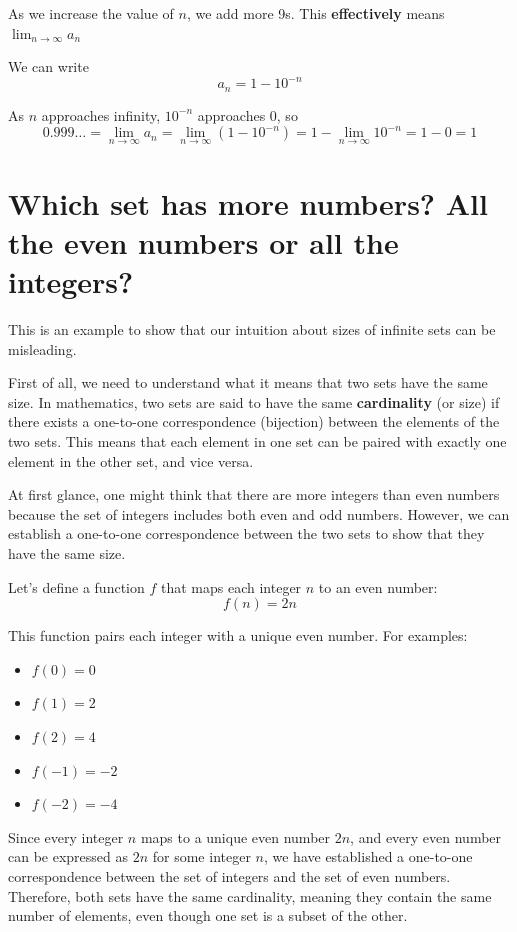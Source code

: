 \documentclass[12pt, letterpaper, oneside]{article}
\begin{document}
As we increase the value of \(n\), we add more 9s. This \textbf{effectively} means \(\lim_{n \to \infty} a_n\)

We can write
\[a_n = 1 - 10^{-n}\]

As \(n\) approaches infinity, \(10^{-n}\) approaches 0, so
\[0.999\ldots = \lim_{n \to \infty} a_n = \lim_{n \to \infty} (1 - 10^{-n}) = 1 - \lim_{n \to \infty} 10^{-n} = 1 - 0 = 1\]

\section{Which set has more numbers? All the even numbers or all the integers?}

This is an example to show that our intuition about sizes of infinite sets can be misleading.

First of all, we need to understand what it means that two sets have the same size. In mathematics, two sets are said to
have the same \textbf{cardinality} (or size) if there exists a one-to-one correspondence (bijection) between the elements
of the two sets. This means that each element in one set can be paired with exactly one element in the other set, and
vice versa.

At first glance, one might think that there are more integers than even numbers because the set of integers includes
both even and odd numbers. However, we can establish a one-to-one correspondence between the two sets to show that they
have the same size.

Let's define a function \(f\) that maps each integer \(n\) to an even number:
\[f(n) = 2n\]

This function pairs each integer with a unique even number. For examples:
\begin{itemize}
  \item \(f(0) = 0\)
  \item \(f(1) = 2\)
  \item \(f(2) = 4\)
  \item \(f(-1) = -2\)
  \item \(f(-2) = -4\)
\end{itemize}

Since every integer \(n\) maps to a unique even number \(2n\), and every even number can be expressed as \(2n\) for some
integer \(n\), we have established a one-to-one correspondence between the set of integers and the set of even numbers.
Therefore, both sets have the same cardinality, meaning they contain the same number of elements, even though one set is
a subset of the other.
\end{document}
